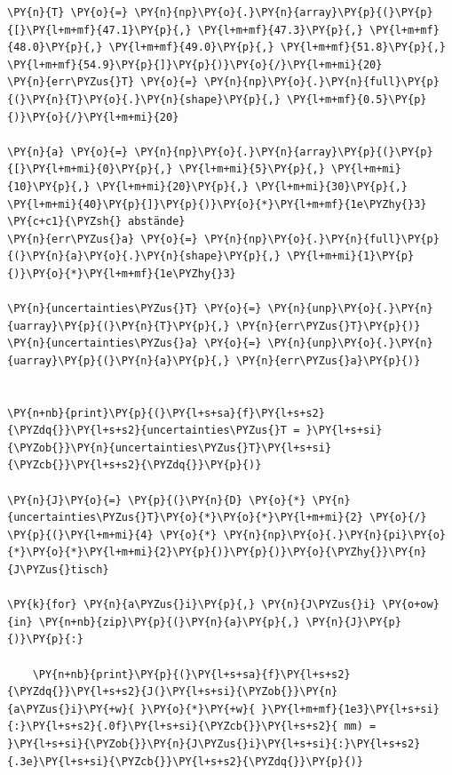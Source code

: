     \begin{tcolorbox}[breakable, size=fbox, boxrule=1pt, pad at break*=1mm,colback=cellbackground, colframe=cellborder]
\begin{Verbatim}[commandchars=\\\{\}]
\PY{n}{T} \PY{o}{=} \PY{n}{np}\PY{o}{.}\PY{n}{array}\PY{p}{(}\PY{p}{[}\PY{l+m+mf}{47.1}\PY{p}{,} \PY{l+m+mf}{47.3}\PY{p}{,} \PY{l+m+mf}{48.0}\PY{p}{,} \PY{l+m+mf}{49.0}\PY{p}{,} \PY{l+m+mf}{51.8}\PY{p}{,} \PY{l+m+mf}{54.9}\PY{p}{]}\PY{p}{)}\PY{o}{/}\PY{l+m+mi}{20}
\PY{n}{err\PYZus{}T} \PY{o}{=} \PY{n}{np}\PY{o}{.}\PY{n}{full}\PY{p}{(}\PY{n}{T}\PY{o}{.}\PY{n}{shape}\PY{p}{,} \PY{l+m+mf}{0.5}\PY{p}{)}\PY{o}{/}\PY{l+m+mi}{20}

\PY{n}{a} \PY{o}{=} \PY{n}{np}\PY{o}{.}\PY{n}{array}\PY{p}{(}\PY{p}{[}\PY{l+m+mi}{0}\PY{p}{,} \PY{l+m+mi}{5}\PY{p}{,} \PY{l+m+mi}{10}\PY{p}{,} \PY{l+m+mi}{20}\PY{p}{,} \PY{l+m+mi}{30}\PY{p}{,} \PY{l+m+mi}{40}\PY{p}{]}\PY{p}{)}\PY{o}{*}\PY{l+m+mf}{1e\PYZhy{}3} \PY{c+c1}{\PYZsh{} abstände}
\PY{n}{err\PYZus{}a} \PY{o}{=} \PY{n}{np}\PY{o}{.}\PY{n}{full}\PY{p}{(}\PY{n}{a}\PY{o}{.}\PY{n}{shape}\PY{p}{,} \PY{l+m+mi}{1}\PY{p}{)}\PY{o}{*}\PY{l+m+mf}{1e\PYZhy{}3}

\PY{n}{uncertainties\PYZus{}T} \PY{o}{=} \PY{n}{unp}\PY{o}{.}\PY{n}{uarray}\PY{p}{(}\PY{n}{T}\PY{p}{,} \PY{n}{err\PYZus{}T}\PY{p}{)}
\PY{n}{uncertainties\PYZus{}a} \PY{o}{=} \PY{n}{unp}\PY{o}{.}\PY{n}{uarray}\PY{p}{(}\PY{n}{a}\PY{p}{,} \PY{n}{err\PYZus{}a}\PY{p}{)}


\PY{n+nb}{print}\PY{p}{(}\PY{l+s+sa}{f}\PY{l+s+s2}{\PYZdq{}}\PY{l+s+s2}{uncertainties\PYZus{}T = }\PY{l+s+si}{\PYZob{}}\PY{n}{uncertainties\PYZus{}T}\PY{l+s+si}{\PYZcb{}}\PY{l+s+s2}{\PYZdq{}}\PY{p}{)}

\PY{n}{J}\PY{o}{=} \PY{p}{(}\PY{n}{D} \PY{o}{*} \PY{n}{uncertainties\PYZus{}T}\PY{o}{*}\PY{o}{*}\PY{l+m+mi}{2} \PY{o}{/} \PY{p}{(}\PY{l+m+mi}{4} \PY{o}{*} \PY{n}{np}\PY{o}{.}\PY{n}{pi}\PY{o}{*}\PY{o}{*}\PY{l+m+mi}{2}\PY{p}{)}\PY{p}{)}\PY{o}{\PYZhy{}}\PY{n}{J\PYZus{}tisch}

\PY{k}{for} \PY{n}{a\PYZus{}i}\PY{p}{,} \PY{n}{J\PYZus{}i} \PY{o+ow}{in} \PY{n+nb}{zip}\PY{p}{(}\PY{n}{a}\PY{p}{,} \PY{n}{J}\PY{p}{)}\PY{p}{:}
    
    \PY{n+nb}{print}\PY{p}{(}\PY{l+s+sa}{f}\PY{l+s+s2}{\PYZdq{}}\PY{l+s+s2}{J(}\PY{l+s+si}{\PYZob{}}\PY{n}{a\PYZus{}i}\PY{+w}{ }\PY{o}{*}\PY{+w}{ }\PY{l+m+mf}{1e3}\PY{l+s+si}{:}\PY{l+s+s2}{.0f}\PY{l+s+si}{\PYZcb{}}\PY{l+s+s2}{ mm) = }\PY{l+s+si}{\PYZob{}}\PY{n}{J\PYZus{}i}\PY{l+s+si}{:}\PY{l+s+s2}{.3e}\PY{l+s+si}{\PYZcb{}}\PY{l+s+s2}{\PYZdq{}}\PY{p}{)}
\end{Verbatim}
\end{tcolorbox}


